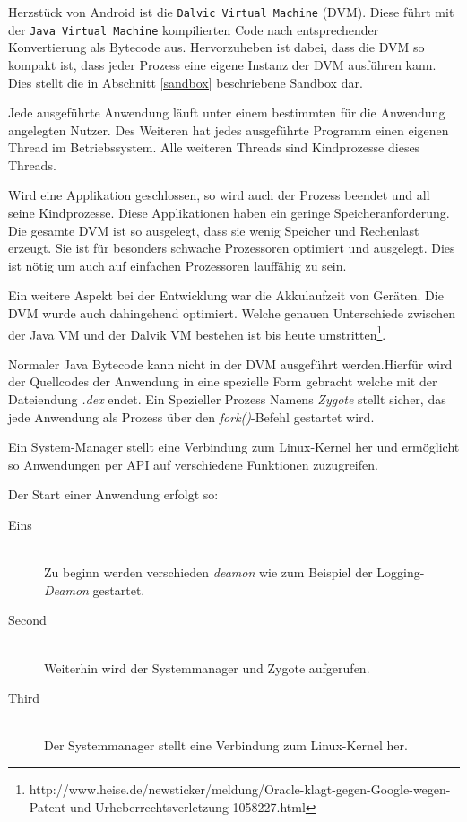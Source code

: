 Herzstück von Android ist die \verb+Dalvic Virtual Machine+ (DVM). Diese führt mit der \verb+Java Virtual Machine+ kompilierten Code nach entsprechender Konvertierung als Bytecode aus. Hervorzuheben ist dabei, dass die DVM so kompakt ist, dass jeder Prozess eine eigene Instanz der DVM ausführen kann. Dies stellt die in Abschnitt \ref{sandbox} beschriebene Sandbox dar.

Jede ausgeführte Anwendung läuft unter einem bestimmten für die Anwendung angelegten Nutzer. Des Weiteren hat jedes ausgeführte Programm einen eigenen Thread im Betriebssystem. Alle weiteren Threads sind Kindprozesse dieses Threads.

Wird eine Applikation geschlossen, so wird auch der Prozess beendet und all seine Kindprozesse. Diese Applikationen haben ein geringe Speicheranforderung. Die gesamte DVM ist so ausgelegt, dass sie wenig Speicher und Rechenlast erzeugt. Sie ist für besonders schwache Prozessoren optimiert und ausgelegt. Dies ist nötig um auch auf einfachen Prozessoren lauffähig zu sein.

Ein weitere Aspekt bei der Entwicklung war die Akkulaufzeit von Geräten. Die DVM wurde auch dahingehend optimiert. Welche genauen Unterschiede zwischen der Java VM und der Dalvik VM bestehen ist bis heute umstritten\footnote{http://www.heise.de/newsticker/meldung/Oracle-klagt-gegen-Google-wegen-Patent-und-Urheberrechtsverletzung-1058227.html}.

Normaler Java Bytecode kann nicht in der DVM ausgeführt werden.Hierfür wird der Quellcodes der Anwendung in eine spezielle Form gebracht welche mit der Dateiendung \textit{.dex} endet. Ein Spezieller Prozess Namens \textit{Zygote} stellt sicher, das jede Anwendung als Prozess über den \textit{fork()}-Befehl gestartet wird.

Ein System-Manager stellt eine Verbindung zum Linux-Kernel her und ermöglicht so Anwendungen per API auf verschiedene Funktionen zuzugreifen.

Der Start einer Anwendung erfolgt so:

\begin{description}

\item[Eins] \hfill \\

Zu beginn werden verschieden \textit{deamon} wie zum Beispiel der Logging-\textit{Deamon} gestartet.

\item[Second] \hfill \\

Weiterhin wird der Systemmanager und Zygote aufgerufen.

\item[Third] \hfill \\

Der Systemmanager stellt eine Verbindung zum Linux-Kernel her.

\end{description}
 
